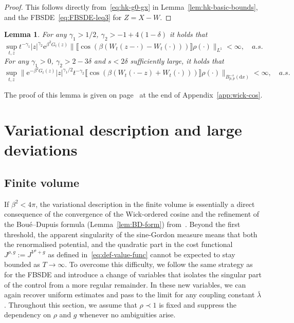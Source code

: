 \documentclass[11pt, a4paper]{scrartcl}
\numberwithin{equation}{section}
\theoremstyle{plain}
\newtheorem{lemma}[foo]{Lemma}
\theoremstyle{remark}
\newcommand{\assign}{:=}
\newcommand{\mathd}{\mathrm{d}}
\newcommand{\mathe}{\mathrm{e}}
\newcommand{\tmtextbf}[1]{\text{{\bfseries{#1}}}}
\begin{document}
\begin{proof}
  This follows directly from~\eqref{eq:hk-g0-gx} in
  Lemma~\ref{lem:hk-basic-bounds}, and the FBSDE~\eqref{eq:FBSDE-leq3} for
  $Z = X - W$.
\end{proof}

\begin{lemma}
  \label{lem:sing-wick-estimates}\tmtextbf{(N)} For any $\gamma_1 > 1 / 2$,
  $\gamma_2 > - 1 + 4 (1 - \delta)$ it holds that
  \[ \sup_{t, z} t^{- \gamma_1} | z |^{\gamma_2} \mathe^{\beta^2 G_t (z)} \|
     \llbracket \cos (\beta (W_t (z - \cdot) - W_t (\cdot))) \rrbracket \rho
     (\cdot) \|_{L^1}  < \infty, \quad a.s. \]
  \tmtextbf{(C)} For any $\gamma_1 > 0$, $\gamma_2 > 2 - 3 \delta$ and $s < 2
  \delta$ sufficiently large, it holds that
  \[ \sup_{t, z} \| \mathe^{- \beta^2 G_t (z)} | z |^{\gamma_1 / 2} t^{-
     \gamma_2} \llbracket \cos (\beta (W_t (\cdot - z) + W_t (\cdot)))
     \rrbracket \rho (\cdot) \|_{B^{- s}_{p, p} (\mathd x)} < \infty, \quad
     a.s. \]
\end{lemma}

The proof of this lemma is given on page~\pageref{proof-lemma-NC} at the end
of Appendix~\ref{app:wick-cos}.

\section{Variational description and large deviations}\label{sec:Var+LDP}
\subsection{Finite volume}

If $\beta^2 < 4 \pi$, the variational description in the finite volume is
essentially a direct consequence of the convergence of the Wick-ordered cosine
and the refinement of the Bou{\'e}--Dupuis formula (Lemma~\ref{lem:BD-form})
from~{\cite{ustunelVariationalCalculationLaplace2014}}. Beyond the first
threshold, the apparent singularity of the sine-Gordon measure means that both
the renormalised potential, and the quadratic part in the cost functional
$J^{\rho, g} \assign J^{V^{\rho} + g}$ as defined in~\eqref{eq:def-value-func}
cannot be expected to stay bounded as $T \rightarrow \infty$. To overcome this
difficulty, we follow the same strategy as for the FBSDE and introduce a
change of variables that isolates the singular part of the control from a more
regular remainder. In these new variables, we can again recover uniform
estimates and pass to the limit for any coupling constant $\bar{\lambda}$.
Throughout this section, we assume that $\rho \prec 1$ is fixed and suppress the
dependency on $\rho$ and $g$ whenever no ambiguities arise.
\end{document}
